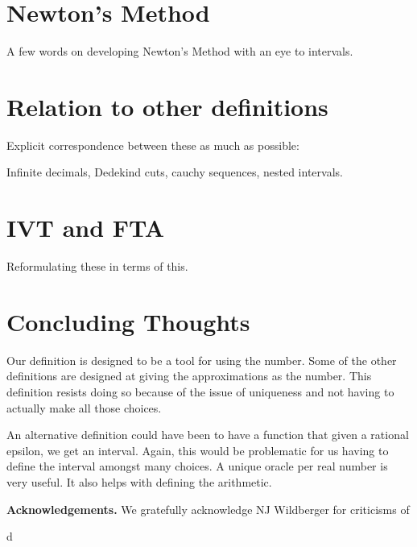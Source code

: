 \documentclass[12pt]{article}
\theoremstyle{remark}
\begin{document}
\section{Newton's Method}

A few words on developing Newton's Method with an eye to intervals. 

\section{Relation to other definitions}

Explicit correspondence between these as much as possible: 

Infinite decimals, Dedekind cuts, cauchy sequences, nested intervals. 

\section{IVT and FTA}

Reformulating these in terms of this. 


\section{Concluding Thoughts}

Our definition is designed to be a tool for using the number. Some of the other definitions are designed at giving the approximations as the number. This definition resists doing so because of the issue of uniqueness and not having to actually make all those choices. 

An alternative definition could have been to have a function that given a rational epsilon, we get an interval. Again, this would be problematic for us having to define the interval amongst many choices. A unique oracle per real number is very useful. It also helps with defining the arithmetic. 



\bigskip

\noindent \textbf{Acknowledgements. } We gratefully acknowledge NJ Wildberger for criticisms of 

\begin{thebibliography}{28.}
d

\end{thebibliography}
\end{document}
